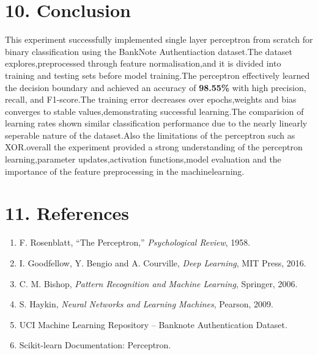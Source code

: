 \documentclass[11pt]{article}
\begin{document}
\section*{10. Conclusion}
This experiment successfully implemented single layer perceptron from scratch for binary classification using the BankNote Authentiaction dataset.The dataset explores,preprocessed through feature normalisation,and it is divided into training and testing sets before model training.The perceptron effectively learned the decision boundary and achieved an accuracy of \textbf{98.55\%} with high precision, recall, and F1-score.The training error decreases over epochs,weights and bias converges to stable values,demonstrating successful learning.The comparision of learning rates shown similar classification performance due to the nearly linearly seperable nature of the dataset.Also the limitations of the perceptron such as XOR.overall the experiment provided a strong understanding of the perceptron learning,parameter updates,activation functions,model evaluation and the importance of the feature preprocessing in the machinelearning.

\section*{11. References}

\begin{enumerate}
\item F. Rosenblatt, ``The Perceptron,'' \emph{Psychological Review}, 1958.
\item I. Goodfellow, Y. Bengio and A. Courville, \emph{Deep Learning}, MIT Press, 2016.
\item C. M. Bishop, \emph{Pattern Recognition and Machine Learning}, Springer, 2006.
\item S. Haykin, \emph{Neural Networks and Learning Machines}, Pearson, 2009.
\item UCI Machine Learning Repository -- Banknote Authentication Dataset.
\item Scikit-learn Documentation: Perceptron.
\end{enumerate}
\end{document}
